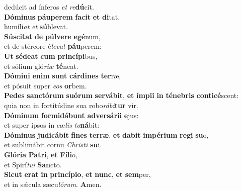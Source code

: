 \oddverse dedúcit ad ínferos \textit{et} \textit{re}\textbf{dú}cit.\\
\evenverse \textbf{Dó}\textbf{mi}\textbf{nus} \textbf{páu}\textbf{pe}\textbf{rem} \textbf{fa}\textbf{cit} \textbf{et} \textbf{di}tat,~\*\\
\evenverse humíli\textit{at} \textit{et} \textbf{sú}blevat.\\
\oddverse \textbf{Sú}\textbf{sci}\textbf{tat} \textbf{de} \textbf{púl}\textbf{ve}\textbf{re} \textbf{e}\textbf{gé}num,~\*\\
\oddverse et de stércore é\textit{le}\textit{vat} \textbf{páu}perem:\\
\evenverse \textbf{Ut} \textbf{sé}\textbf{de}\textbf{at} \textbf{cum} \textbf{prin}\textbf{cí}\textbf{pi}bus,~\*\\
\evenverse et sólium gló\textit{ri}\textit{æ} \textbf{té}neat.\\
\oddverse \textbf{Dó}\textbf{mi}\textbf{ni} \textbf{e}\textbf{nim} \textbf{sunt} \textbf{cár}\textbf{di}\textbf{nes} \textbf{ter}ræ,~\*\\
\oddverse et pósuit super \textit{e}\textit{os} \textbf{or}bem.\\
\evenverse \textbf{Pe}\textbf{des} \textbf{san}\textbf{ctó}\textbf{rum} \textbf{su}\textbf{ó}\textbf{rum} \textbf{ser}\textbf{vá}\textbf{bit}, \textbf{et} \textbf{ím}\textbf{pi}\textbf{i} \textbf{in} \textbf{té}\textbf{ne}\textbf{bris} \textbf{con}\textbf{ti}\textbf{cé}scent:~\*\\
\evenverse quia non in fortitúdine sua robo\textit{rá}\textit{bi}\textbf{tur} vir.\\
\oddverse \textbf{Dó}\textbf{mi}\textbf{num} \textbf{for}\textbf{mi}\textbf{dá}\textbf{bunt} \textbf{ad}\textbf{ver}\textbf{sá}\textbf{ri}\textbf{i} \textbf{e}jus:~\*\\
\oddverse et super ipsos in cæ\textit{lis} \textit{to}\textbf{ná}bit:\\
\evenverse \textbf{Dó}\textbf{mi}\textbf{nus} \textbf{ju}\textbf{di}\textbf{cá}\textbf{bit} \textbf{fi}\textbf{nes} \textbf{ter}\textbf{ræ}, \textbf{et} \textbf{da}\textbf{bit} \textbf{im}\textbf{pé}\textbf{ri}\textbf{um} \textbf{re}\textbf{gi} \textbf{su}o,~\*\\
\evenverse et sublimábit cornu \textit{Chri}\textit{sti} \textbf{su}i.\\
\oddverse \textbf{Gló}\textbf{ri}\textbf{a} \textbf{Pa}\textbf{tri}, \textbf{et} \textbf{Fí}\textbf{li}o,~\*\\
\oddverse et Spirí\textit{tu}\textit{i} \textbf{San}cto.\\
\evenverse \textbf{Si}\textbf{cut} \textbf{e}\textbf{rat} \textbf{in} \textbf{prin}\textbf{cí}\textbf{pi}\textbf{o}, \textbf{et} \textbf{nunc}, \textbf{et} \textbf{sem}per,~\*\\
\evenverse et in sǽcula sæcu\textit{ló}\textit{rum}. \textbf{A}men.\\
